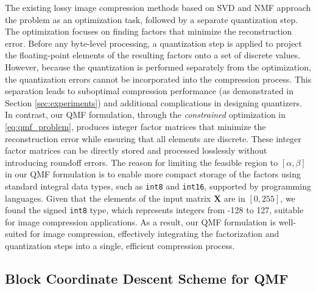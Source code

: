 The existing lossy image compression methods based on SVD and NMF approach the problem as an optimization task, followed by a separate quantization step. The optimization focuses on finding factors that minimize the reconstruction error. Before any byte-level processing, a quantization step is applied to project the floating-point elements of the resulting factors onto a set of discrete values. However, because the quantization is performed separately from the optimization, the quantization errors cannot be incorporated into the compression process. This separation leads to suboptimal compression performance (as demonstrated in Section \ref{sec:experiments}) and additional complications in designing quantizers.
In contrast, our QMF formulation, through the \emph{constrained} optimization in \eqref{eq:qmf_problem}, produces integer factor matrices that minimize the reconstruction error while ensuring that all elements are discrete. These integer factor matrices can be directly stored and processed losslessly without introducing roundoff errors. The reason for limiting the feasible region to $[\alpha,\beta]$ in our QMF formulation is to enable more compact storage of the factors using standard integral data types, such as \texttt{int8} and \texttt{int16}, supported by programming languages. Given that the elements of the input matrix $\bm{X}$ are in $[0, 255]$, we found the signed \texttt{int8} type, which represents integers from -128 to 127, suitable for image compression applications. As a result, our QMF formulation is well-suited for image compression, effectively integrating the factorization and quantization steps into a single, efficient compression process.


\subsection{Block Coordinate Descent Scheme for QMF} \label{sec:bcd}


